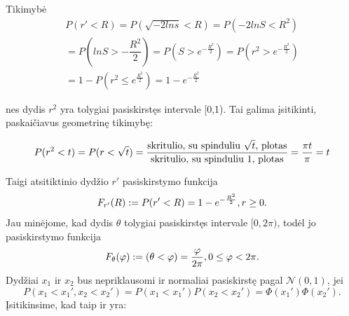 \documentclass[12pt]{article}
\begin{document}
Tikimybė
\begin{equation}
\begin{split}
P(r' < R) = P(\sqrt{-2 ln{s}}<R) = P(-2 ln{S} < R^2)\\
= P(ln{S} > - \dfrac{R^2}{2}) = P(S > e^{-\frac{R^2}{2}}) = P(r^2 > e^{-\frac{R ^2}{2}})\\
=1 - P(r^2 \leq e^\frac{R^2}{2})=1-e^{-\frac{R^2}{2}}
\end{split} \nonumber
\end{equation}

nes dydis $r^2$ yra tolygiai pasiskirstęs intervale [0,1). Tai galima įsitikinti, paskaičiavus geometrinę tikimybę:

\begin{equation}
P(r^2 < t) = P(r < \sqrt{t}) = \dfrac{\textnormal{skritulio, su spinduliu $\sqrt{t}$, plotas}}{\textnormal{skritulio, su spinduliu 1, plotas}} = \dfrac{\pi t}{\pi} = t \nonumber
\end{equation}

Taigi atsitiktinio dydžio $r'$ pasiskirstymo funkcija 
\begin{equation}
F_{r'}(R):=P(r' < R) = 1 - e^{-\frac{R^2}{2}}, \space r \geq 0. \nonumber
\end{equation}
Jau minėjome, kad dydis $\theta$ tolygiai pasiskirstęs intervale $[0,2\pi)$, todėl jo pasiskirstymo funkcija 
\begin{equation}
F_\theta(\varphi):=(\theta < \varphi) = \frac{\varphi}{2\pi}, \space 0 \leq \varphi < 2\pi. \nonumber
\end{equation}
Dydžiai $x_1$ ir $x_2$ bus nepriklausomi ir normaliai pasiskirstę pagal $\mathcal{N}(0,1)$, jei
\begin{equation}
P(x_1<x_1',x_2<x_2') = P(x_1<x_1')P(x_2<x_2')=\Phi(x_1')\Phi(x_2'). \nonumber
\end{equation} 
Įsitikinsime, kad taip ir yra:

\newcommand*{\bfrac}[2]{\genfrac{}{}{0pt}{}{#1}{#2}}
\end{document}
